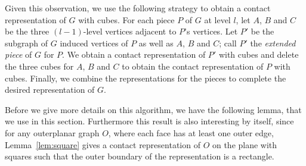 \documentclass{llncs}
\begin{document}
Given this observation, we use the following strategy to obtain a contact representation of $G$
 with cubes. For each piece $P$ of $G$ at level $l$, let $A$, $B$ and $C$ be the three
 $(l-1)$-level vertices adjacent to $P$'s vertices. Let $P'$ be
 the subgraph of $G$
 induced vertices of $P$ as well as $A$, $B$ and
 $C$; call $P'$ the {\em extended
 piece} of $G$ for $P$. We obtain a contact representation of $P'$ with cubes and delete
 the three cubes for $A$, $B$ and $C$ to obtain the contact representation of $P$ with cubes.
 Finally, we combine the representations for the pieces to complete the desired
 representation of $G$.


Before we give more details on this algorithm, we have the following lemma, that we use in this section.
 Furthermore this result is also interesting by itself, since for any outerplanar graph $O$, where each
 face has at least one outer edge, Lemma~\ref{lem:square} gives a contact representation of $O$ on
 the plane with squares such that the outer boundary of the representation is a rectangle.
\end{document}
